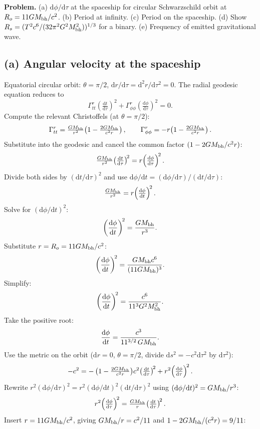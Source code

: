 \documentclass[11pt]{article}
\newcommand{\de}{\mathrm{d}}
\begin{document}
\textbf{Problem.} (a) $\de\phi/\de\tau$ at the spaceship for circular Schwarzschild orbit at $R_o = 11GM_{\rm bh}/c^2$. (b) Period at infinity. (c) Period on the spaceship. (d) Show $R_s = (T^2 c^6/(32\pi^2 G^2 M_{\rm bh}^2))^{1/3}$ for a binary. (e) Frequency of emitted gravitational wave.

\subsection*{(a) Angular velocity at the spaceship}

Equatorial circular orbit: $\theta = \pi/2$, $\de r/\de\tau = \de^2 r/\de\tau^2 = 0$. The radial geodesic equation reduces to
\[ \Gamma^r_{tt}\!\left(\tfrac{\de t}{\de\tau}\right)^{\!2} + \Gamma^r_{\phi\phi}\!\left(\tfrac{\de\phi}{\de\tau}\right)^{\!2} = 0. \]
Compute the relevant Christoffels (at $\theta=\pi/2$):
\[ \Gamma^r_{tt} = \tfrac{GM_{\rm bh}}{r^2}\!\left(1-\tfrac{2GM_{\rm bh}}{c^2 r}\right),\qquad \Gamma^r_{\phi\phi} = -r\!\left(1-\tfrac{2GM_{\rm bh}}{c^2 r}\right). \]
Substitute into the geodesic and cancel the common factor $(1-2GM_{\rm bh}/c^2 r)$:
\[ \tfrac{GM_{\rm bh}}{r^2}\!\left(\tfrac{\de t}{\de\tau}\right)^{\!2} = r\!\left(\tfrac{\de\phi}{\de\tau}\right)^{\!2}. \]
Divide both sides by $(\de t/\de\tau)^2$ and use $\de\phi/\de t = (\de\phi/\de\tau)/(\de t/\de\tau)$:
\[ \tfrac{GM_{\rm bh}}{r^2} = r\!\left(\tfrac{\de\phi}{\de t}\right)^{\!2}. \]
Solve for $(\de\phi/\de t)^2$:
\[ \left(\frac{\de\phi}{\de t}\right)^{\!2} = \frac{GM_{\rm bh}}{r^3}. \]
Substitute $r = R_o = 11 GM_{\rm bh}/c^2$:
\[ \left(\frac{\de\phi}{\de t}\right)^{\!2} = \frac{GM_{\rm bh} c^6}{(11 GM_{\rm bh})^3}. \]
Simplify:
\[ \left(\frac{\de\phi}{\de t}\right)^{\!2} = \frac{c^6}{11^3 G^2 M_{\rm bh}^2}. \]
Take the positive root:
\begin{equation}
\frac{\de\phi}{\de t} = \frac{c^3}{11^{3/2}\,GM_{\rm bh}}.
\label{eq:dphi-dt}
\end{equation}
Use the metric on the orbit ($\de r = 0$, $\theta = \pi/2$, divide $\de s^2 = -c^2\de\tau^2$ by $\de\tau^2$):
\[ -c^2 = -\left(1-\tfrac{2GM_{\rm bh}}{c^2 r}\right)\!c^2\!\left(\tfrac{\de t}{\de\tau}\right)^{\!2} + r^2\!\left(\tfrac{\de\phi}{\de\tau}\right)^{\!2}. \]
Rewrite $r^2(\de\phi/\de\tau)^2 = r^2(\de\phi/\de t)^2(\de t/\de\tau)^2$ using $(\de\phi/\de t)^2 = GM_{\rm bh}/r^3$:
\[ r^2\!\left(\tfrac{\de\phi}{\de\tau}\right)^{\!2} = \tfrac{GM_{\rm bh}}{r}\!\left(\tfrac{\de t}{\de\tau}\right)^{\!2}. \]
Insert $r = 11GM_{\rm bh}/c^2$, giving $GM_{\rm bh}/r = c^2/11$ and $1-2GM_{\rm bh}/(c^2 r) = 9/11$:
\end{document}

